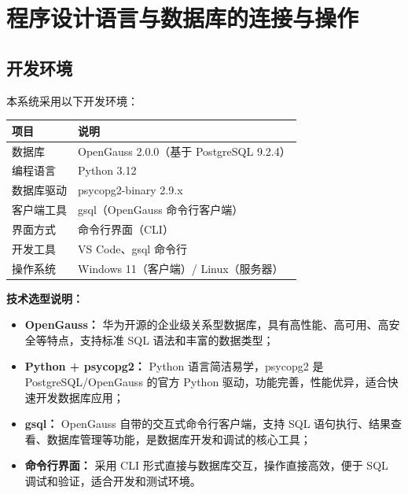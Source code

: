 \documentclass[12pt,a4paper]{article}
\begin{document}
\section{程序设计语言与数据库的连接与操作}

\subsection{开发环境}

本系统采用以下开发环境：

\begin{table}[htbp]
  \centering
  \renewcommand{\arraystretch}{1.5}
  \begin{tabularx}{\textwidth}{>{\raggedright\arraybackslash}p{2.5cm} >{\raggedright\arraybackslash}X}
    \toprule
    \textbf{项目} & \textbf{说明} \\
    \midrule
    数据库 & OpenGauss 2.0.0（基于 PostgreSQL 9.2.4） \\
    编程语言 & Python 3.12 \\
    数据库驱动 & psycopg2-binary 2.9.x \\
    客户端工具 & gsql（OpenGauss 命令行客户端） \\
    界面方式 & 命令行界面（CLI） \\
    开发工具 & VS Code、gsql 命令行 \\
    操作系统 & Windows 11（客户端）/ Linux（服务器） \\
    \bottomrule
  \end{tabularx}
\end{table}

\textbf{技术选型说明：}
\begin{itemize}
  \item \textbf{OpenGauss：} 华为开源的企业级关系型数据库，具有高性能、高可用、高安全等特点，支持标准 SQL 语法和丰富的数据类型；
  \item \textbf{Python + psycopg2：} Python 语言简洁易学，psycopg2 是 PostgreSQL/OpenGauss 的官方 Python 驱动，功能完善，性能优异，适合快速开发数据库应用；
  \item \textbf{gsql：} OpenGauss 自带的交互式命令行客户端，支持 SQL 语句执行、结果查看、数据库管理等功能，是数据库开发和调试的核心工具；
  \item \textbf{命令行界面：} 采用 CLI 形式直接与数据库交互，操作直接高效，便于 SQL 调试和验证，适合开发和测试环境。
\end{itemize}
\end{document}
